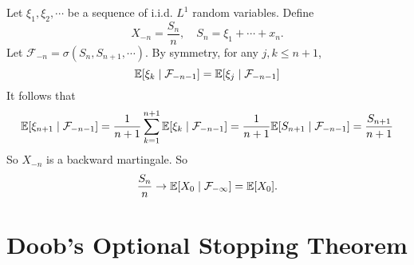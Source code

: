 \begin{exam}
    Let $\xi_1,\xi_2,\cdots$ be a sequence of i.i.d. $L^1$ random variables. Define
    \begin{equation*}
        X_{-n} = \frac{S_n}{n},\quad S_n =\xi_1 + \cdots + x_n.
    \end{equation*}
    Let $\mathcal{F}_{-n} = \sigma(S_n,S_{n+1},\cdots)$. By symmetry, for any $j,k \leq n+1$,
    \begin{equation*}
        \mathbb{E}[\xi_k \mid \mathcal{F}_{-n-1}] = \mathbb{E}[\xi_j \mid \mathcal{F}_{-n-1}]
    \end{equation*}
    It follows that
    \begin{equation*}
        \mathbb{E}[\xi_{n+1} \mid \mathcal{F}_{-n-1}] = \frac{1}{n+1}\sum_{k=1}^{n+1}\mathbb{E}[\xi_k \mid \mathcal{F}_{-n-1}] = \frac{1}{n+1}\mathbb{E}[S_{n+1} \mid \mathcal{F}_{-n-1}] = \frac{S_{n+1}}{n+1}
    \end{equation*}
    So $X_{-n}$ is a backward martingale. So
    \begin{equation*}
        \frac{S_n}{n} \rightarrow \mathbb{E}[X_0 \mid \mathcal{F}_{-\infty}] = \mathbb{E}[X_0].
    \end{equation*}
\end{exam}

\section{Doob's Optional Stopping Theorem}

